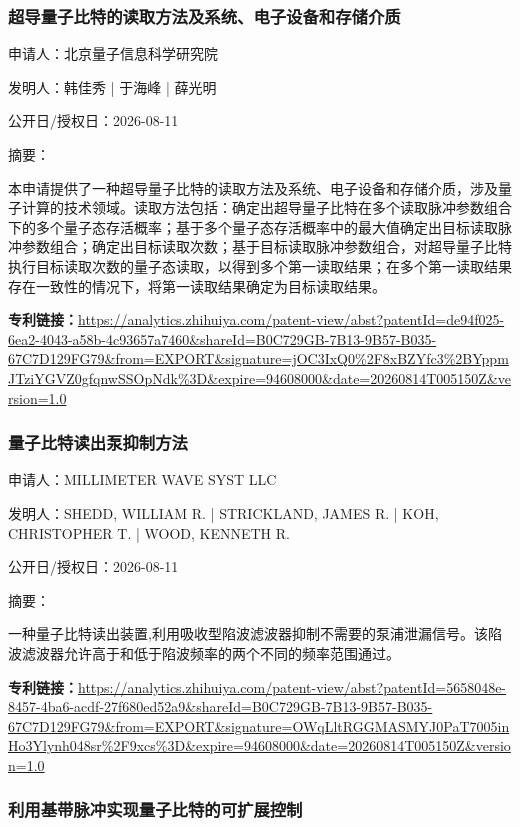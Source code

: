 \documentclass[12pt,a4paper]{ctexart}
\begin{document}
\subsubsection{ 超导量子比特的读取方法及系统、电子设备和存储介质 }

申请人：北京量子信息科学研究院

发明人：韩佳秀 | 于海峰 | 薛光明

公开日/授权日：2026-08-11

摘要：

本申请提供了一种超导量子比特的读取方法及系统、电子设备和存储介质，涉及量子计算的技术领域。读取方法包括：确定出超导量子比特在多个读取脉冲参数组合下的多个量子态存活概率；基于多个量子态存活概率中的最大值确定出目标读取脉冲参数组合；确定出目标读取次数；基于目标读取脉冲参数组合，对超导量子比特执行目标读取次数的量子态读取，以得到多个第一读取结果；在多个第一读取结果存在一致性的情况下，将第一读取结果确定为目标读取结果。

\noindent\textbf{专利链接：}\url{https://analytics.zhihuiya.com/patent-view/abst?patentId=de94f025-6ea2-4043-a58b-4c93657a7460&shareId=B0C729GB-7B13-9B57-B035-67C7D129FG79&from=EXPORT&signature=jOC3IxQ0%2F8xBZYfc3%2BYppmJTziYGVZ0gfqnwSSOpNdk%3D&expire=94608000&date=20260814T005150Z&version=1.0}

\subsubsection{ 量子比特读出泵抑制方法 }

申请人：MILLIMETER WAVE SYST LLC

发明人：SHEDD, WILLIAM R. | STRICKLAND, JAMES R. | KOH, CHRISTOPHER T. | WOOD, KENNETH R.

公开日/授权日：2026-08-11

摘要：

一种量子比特读出装置,利用吸收型陷波滤波器抑制不需要的泵浦泄漏信号。该陷波滤波器允许高于和低于陷波频率的两个不同的频率范围通过。

\noindent\textbf{专利链接：}\url{https://analytics.zhihuiya.com/patent-view/abst?patentId=5658048e-8457-4ba6-acdf-27f680ed52a9&shareId=B0C729GB-7B13-9B57-B035-67C7D129FG79&from=EXPORT&signature=OWqLltRGGMASMYJ0PaT7005inHo3Ylynh048sr%2F9xcs%3D&expire=94608000&date=20260814T005150Z&version=1.0}

\subsubsection{ 利用基带脉冲实现量子比特的可扩展控制 }
\end{document}
